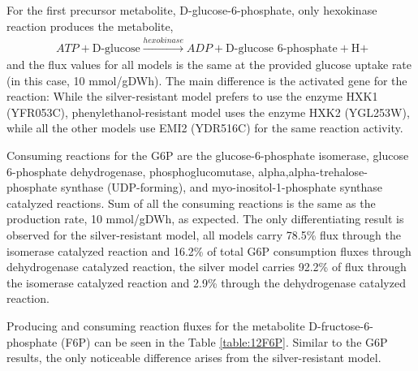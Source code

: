\vspace{-0.5cm}

For the first precursor metabolite, D-glucose-6-phosphate, only hexokinase reaction produces the metabolite,
\begin{align}
\ ATP + \text{D-glucose} \xrightarrow{hexokinase} ADP + \text{D-glucose 6-phosphate} + \text{H+}
\end{align}
and the flux values for all models is the same at the provided glucose uptake rate (in this case, 10 mmol/gDWh). The main difference is the activated gene for the reaction: While the silver-resistant model prefers to use the enzyme HXK1 (YFR053C), phenylethanol-resistant model uses the enzyme HXK2 (YGL253W), while all the other models use EMI2 (YDR516C) for the same reaction activity.

Consuming reactions for the G6P are the glucose-6-phosphate isomerase, glucose 6-phosphate dehydrogenase, phosphoglucomutase, alpha,alpha-trehalose-phosphate synthase (UDP-forming), and myo-inositol-1-phosphate synthase catalyzed reactions. Sum of all the consuming reactions is the same as the production rate, 10 mmol/gDWh, as expected. The only differentiating result is observed for the silver-resistant model, all models carry 78.5\% flux through the isomerase catalyzed reaction and 16.2\% of total G6P consumption fluxes through dehydrogenase catalyzed reaction, the silver model carries 92.2\% of flux through the isomerase catalyzed reaction and 2.9\% through the dehydrogenase catalyzed reaction.

Producing and consuming reaction fluxes for the metabolite D-fructose-6-phosphate (F6P) can be seen in the Table \ref{table:12F6P}. Similar to the G6P results, the only noticeable difference arises from the silver-resistant model.

